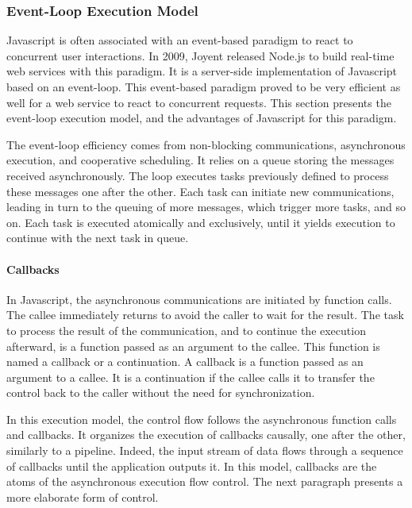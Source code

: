 \subsubsection{Event-Loop Execution Model} \label{chapter2:web-as-a-platform:javascript:event-loop}

Javascript is often associated with an event-based paradigm to react to concurrent user interactions.
In 2009, Joyent released Node.js to build real-time web services with this paradigm.
It is a server-side implementation of Javascript based on an event-loop.
This event-based paradigm proved to be very efficient as well for a web service to react to concurrent requests.
This section presents the event-loop execution model, and the advantages of Javascript for this paradigm.

The event-loop efficiency comes from non-blocking communications, asynchronous execution, and cooperative scheduling.
It relies on a queue storing the messages received asynchronously.
The loop executes tasks previously defined to process these messages one after the other.
Each task can initiate new communications, leading in turn to the queuing of more messages, which trigger more tasks, and so on.
Each task is executed atomically and exclusively, until it yields execution to continue with the next task in queue.


\paragraph{Callbacks}

In Javascript, the asynchronous communications are initiated by function calls.
The callee immediately returns to avoid the caller to wait for the result.
The task to process the result of the communication, and to continue the execution afterward, is a function passed as an argument to the callee.
This function is named a callback or a continuation.
A callback is a function passed as an argument to a callee.
It is a continuation if the callee calls it to transfer the control back to the caller without the need for synchronization.

In this execution model, the control flow follows the asynchronous function calls and callbacks.
It organizes the execution of callbacks causally, one after the other, similarly to a pipeline.
Indeed, the input stream of data flows through a sequence of callbacks until the application outputs it.
In this model, callbacks are the atoms of the asynchronous execution flow control.
The next paragraph presents a more elaborate form of control.

